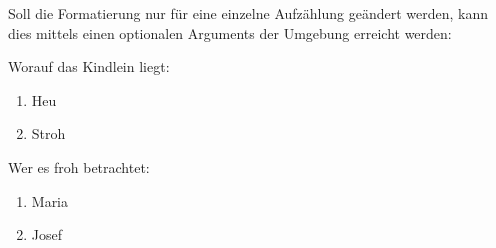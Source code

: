 Soll die Formatierung nur für eine einzelne Aufzählung geändert werden, kann dies mittels einen optionalen Arguments der Umgebung erreicht werden:
\begin{latexlisting}
	Worauf das Kindlein liegt:
	\begin{enumerate}[label=|\Alph*|]
		\item Heu
		\item Stroh
	\end{enumerate}
	Wer es froh betrachtet:
	\begin{enumerate}[label=\textbf{\Roman*}]
		\item Maria
		\item Josef
	\end{enumerate}
\end{latexlisting}
